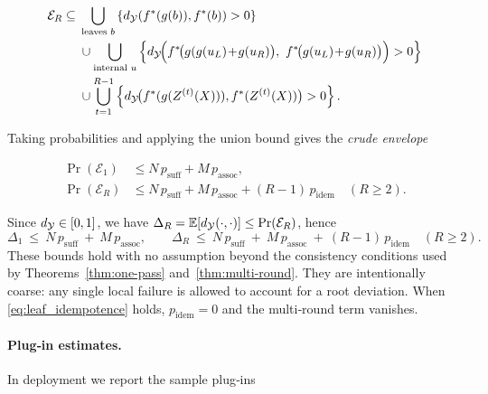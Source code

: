 
\begin{align*}
\mathcal{E}_R \subseteq{}& \bigcup_{\text{leaves }b}\left\{\metric(\fstar(g(b)),\fstar(b))>0\right\} \\
&\cup \bigcup_{\text{internal }u}\left\{\metric\!\Big(\fstar\!\big(g(g(u_L)\!+\!g(u_R)\big),\ \fstar\!\big(g(u_L)\!+\!g(u_R)\big)\Big)>0\right\} \\
&\cup \bigcup_{t=1}^{R-1}\left\{\metric\!\big(\fstar(g(Z^{(t)}(X))),\fstar(Z^{(t)}(X))\big)>0\right\}.
\end{align*}


Taking probabilities and applying the union bound gives the \emph{crude envelope}

\begin{align*}
\Pr(\mathcal{E}_1) &\le N\,p_{\text{suff}} + M\,p_{\text{assoc}}, \\
\Pr(\mathcal{E}_R) &\le N\,p_{\text{suff}} + M\,p_{\text{assoc}} + (R-1)\,p_{\text{idem}}\quad(R\ge2).
\end{align*}

Since $d_{\mathcal{Y}}\in[0,1]$, we have $\Delta_R=\mathbb{E}[d_{\mathcal{Y}}(\cdot,\cdot)]\le \Pr(\mathcal{E}_R)$, hence
\begin{equation}\label{eq:unionbound}
\Delta_1\ \le\ N\,p_{\text{suff}}\ +\ M\,p_{\text{assoc}},\qquad
\Delta_R\ \le\ N\,p_{\text{suff}}\ +\ M\,p_{\text{assoc}}\ +\ (R-1)\,p_{\text{idem}}\quad(R\ge2).
\end{equation}
These bounds hold with no assumption beyond the consistency conditions used by Theorems~\ref{thm:one-pass}
and~\ref{thm:multi-round}. They are intentionally coarse: any single local failure is allowed to
account for a root deviation. When \eqref{eq:leaf_idempotence} holds, $p_{\text{idem}}=0$ and the
multi‑round term vanishes.

\paragraph{Plug‑in estimates.}
In deployment we report the sample plug‑ins

